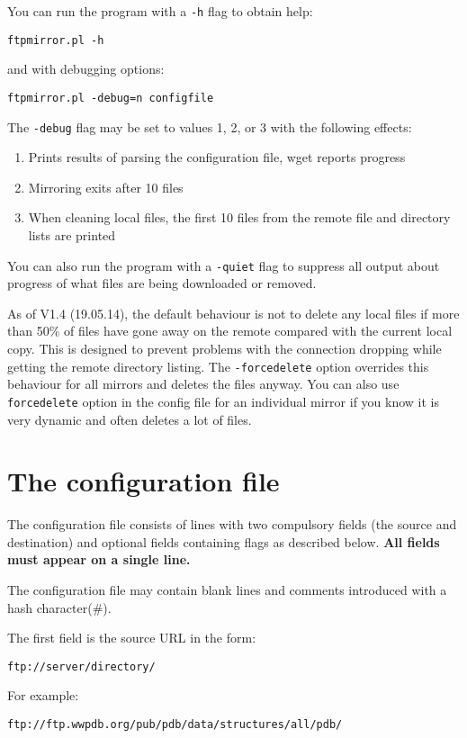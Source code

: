 \documentclass{article}
\begin{document}
You can run the program with a \verb|-h| flag to obtain help:
\begin{verbatim}
ftpmirror.pl -h
\end{verbatim}
and with debugging options:
\begin{verbatim}
ftpmirror.pl -debug=n configfile
\end{verbatim}
The \verb|-debug| flag may be set to values 1, 2, or 3 with the
following effects:
\begin{enumerate}
\item Prints results of parsing the configuration file, wget reports
  progress 
\item Mirroring exits after 10 files
\item When cleaning local files, the first 10 files from the remote
  file and directory lists are printed
\end{enumerate}
\vspace{2em}

You can also run the program with a \verb|-quiet| flag to suppress all
output about progress of what files are being downloaded or removed.

As of V1.4 (19.05.14), the default behaviour is not to delete any
local files if more than 50\% of files have gone away on the remote
compared with the current local copy. This is designed to prevent
problems with the connection dropping while getting the remote
directory listing. The \verb|-forcedelete| option overrides this behaviour 
for all mirrors and deletes the files anyway. You can also use
\verb|forcedelete| option in the config file for an individual mirror
if you know it is very dynamic and often deletes a lot of files.


\section{The configuration file}
The configuration file consists of lines with two compulsory fields
(the source and destination) and optional fields containing flags as
described below. {\bfseries All fields must appear on a single line.}

The configuration file may contain blank lines and comments introduced
with a hash character(\#).
\vspace{2em}

The first field is the source URL in the form:
\begin{verbatim}
ftp://server/directory/
\end{verbatim}
For example:
\begin{verbatim}
ftp://ftp.wwpdb.org/pub/pdb/data/structures/all/pdb/
\end{verbatim}
\end{document}
